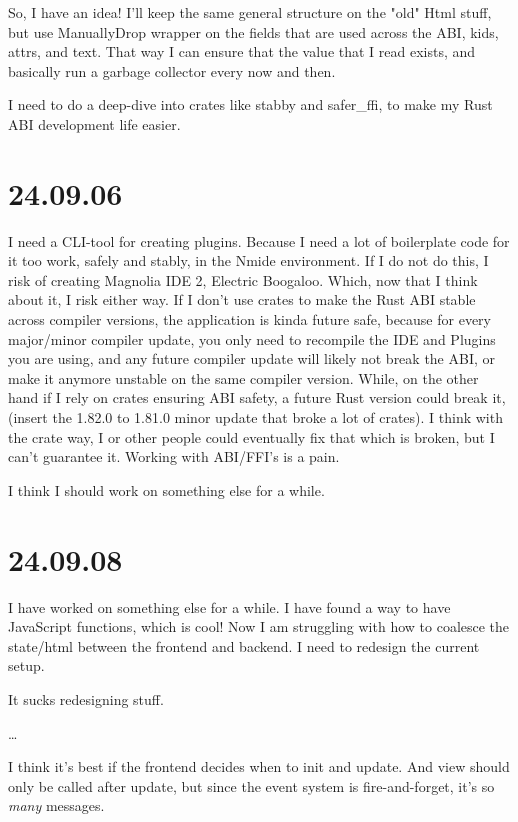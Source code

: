 So, I have an idea! I'll keep the same general structure on the "old" Html
stuff, but use ManuallyDrop wrapper on the fields that are used across the ABI,
kids, attrs, and text. That way I can ensure that the value that I read exists,
and basically run a garbage collector every now and then.

I need to do a deep-dive into crates like stabby and safer_ffi, to make my Rust
ABI development life easier.


\section{24.09.06}

I need a CLI-tool for creating plugins. Because I need a lot of boilerplate
code for it too work, safely and stably, in the Nmide environment. If I do not
do this, I risk of creating Magnolia IDE 2, Electric Boogaloo. Which, now that
I think about it, I risk either way. If I don't use crates to make the Rust ABI
stable across compiler versions, the application is kinda future safe, because
for every major/minor compiler update, you only need to recompile the IDE and
Plugins you are using, and any future compiler update will likely not break the
ABI, or make it anymore unstable on the same compiler version. While, on the
other hand if I rely on crates ensuring ABI safety, a future Rust version could
break it, (insert the 1.82.0 to 1.81.0 minor update that broke a lot of crates).
I think with the crate way, I or other people could eventually fix that which is
broken, but I can't guarantee it. Working with ABI/FFI's is a pain.

I think I should work on something else for a while.


\section{24.09.08}

I have worked on something else for a while. I have found a way to have
JavaScript functions, which is cool! Now I am struggling with how to coalesce
the state/html between the frontend and backend. I need to redesign the current
setup.

It sucks redesigning stuff.

\dots

I think it's best if the frontend decides when to init and update. And view
should only be called after update, but since the event system is
fire-and-forget, it's so \textit{many} messages.

